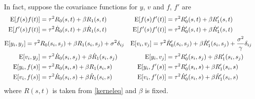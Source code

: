 In fact, suppose the covariance functions for $y$, $v$ and $f$, $f'$ are \small
\begin{align*}
\mathrm{E}\lbrack f(s)f (t)\rbrack &=\tau^2R_0(s,t)+\beta R_1(s,t) & \mathrm{E} \lbrack f(s)f '(t)\rbrack&=\tau^2R_0'(s,t)+\beta R_1'(s,t) \\
\mathrm{E}\lbrack f '(s)f (t)\rbrack&=\tau^2\dot{R}_0(s,t)+\beta\dot{R}_1(s,t) & \mathrm{E}\lbrack f '(s)f '(t)\rbrack&=\tau^2\dot{R}'_0(s,t)+\beta\dot{R}'_1(s,t) \\
\footnotesize \mathrm{E}\lbrack y_i,y_j\rbrack=\tau^2 & R_0(s_i,s_j)+\beta R_1(s_i,s_j)+\sigma^2\delta_{ij}   & 
\mathrm{E} \lbrack v_i,v_j\rbrack=\tau^2&\dot{R}'_0(s_i,s_j)+\beta\dot{R}'_1(s_i,s_j) +\frac{\sigma^2}{\gamma}\delta_{ij} \\ 
\normalsize
\mathrm{E}\lbrack v_i,y_j\rbrack&=\tau^2\dot{R}_0(s_i,s_j)+\beta \dot{R}_1(s_i,s_j) &
\mathrm{E}\lbrack y_i,v_j\rbrack&=\tau^2R_0'(s_i,s_j)+\beta R_1'(s_i,s_j)\\
\mathrm{E}\lbrack y_i,f(s)\rbrack&=\tau^2 R_0(s_i,s)+\beta R_1(s_i,s)  & \mathrm{E}\lbrack y_i,f '(s)\rbrack&=\tau^2 R'_0(s_i,s)+\beta R'_1(s_i,s)  \\
\mathrm{E}\lbrack v_i,f(s)\rbrack&=\tau^2 \dot{R}_0(s_i,s)+\beta \dot{R}_1(s_i,s) & \mathrm{E}\lbrack v_i,f '(s)\rbrack&=\tau^2\dot{R}'_0(s_i,s)+\beta \dot{R}'_1(s_i,s)
\end{align*}
\normalsize where $R(s,t)$ is taken from \eqref{kerneleq} and $\beta$ is fixed. 


